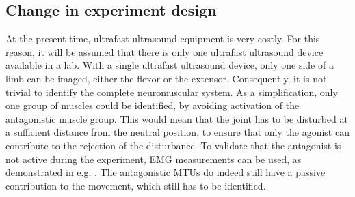 


\subsection{Change in experiment design}
At the present time, ultrafast ultrasound equipment is very costly. For this reason, it will be assumed that there is only one ultrafast ultrasound device available in a lab. With a single ultrafast ultrasound device, only one side of a limb can be imaged, either the flexor or the extensor. Consequently, it is not trivial to identify the complete neuromuscular system. As a simplification, only one group of muscles could be identified, by avoiding activation of the antagonistic muscle group. This would mean that the joint has to be disturbed at a sufficient distance from the neutral position, to ensure that only the agonist can contribute to the rejection of the disturbance. To validate that the antagonist is not active during the experiment, EMG measurements can be used, as demonstrated in e.g. \cite{kearney_identification_1997, mirbagheri_intrinsic_2000}. The antagonistic MTUs do indeed still have a passive contribution to the movement, which still has to be identified. 

